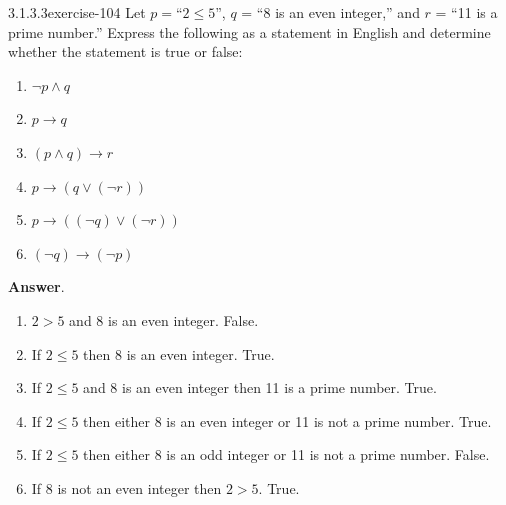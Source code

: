 \documentclass[twoside,10pt,]{book}
\numberwithin{equation}{section}
\begin{document}
\begin{divisionsolution}{3.1.3.3}{}{exercise-104}%
\hypertarget{p-919}{}%
Let \(p =\)``\(2 \leq 5\)'', \(q\) = ``8 is an even integer,'' and \(r\) = ``11 is a prime number.'' Express the following as a statement in English and determine whether the statement is true or false:%
\par
\hypertarget{p-920}{}%
\leavevmode%
\begin{multicols}{2}
\begin{enumerate}[label=(\alph*)]
\item\hypertarget{li-507}{}\hypertarget{p-921}{}%
\(\neg  p \land  q\)%
\item\hypertarget{li-508}{}\hypertarget{p-922}{}%
\(p\rightarrow q\)%
\item\hypertarget{li-509}{}\hypertarget{p-923}{}%
\((p \land q)\to r\)%
\item\hypertarget{li-510}{}\hypertarget{p-924}{}%
\(p \rightarrow (q \lor  (\neg r))\)%
\item\hypertarget{li-511}{}\hypertarget{p-925}{}%
\(p \rightarrow ((\neg q)\lor  (\neg r))\)%
\item\hypertarget{li-512}{}\hypertarget{p-926}{}%
\((\neg q) \rightarrow  (\neg p)\)%
\end{enumerate}
\end{multicols}
%
\par\smallskip%
\noindent\textbf{Answer}.\quad%
\hypertarget{p-927}{}%
\leavevmode%
\begin{enumerate}[label=(\alph*)]
\item\hypertarget{li-513}{}\(2>5\) and 8 is an even integer. False.%
\item\hypertarget{li-514}{}If \(2\leqslant 5\) then 8 is an even integer. True.%
\item\hypertarget{li-515}{}If \(2\leqslant 5\) and 8 is an even integer then 11 is a prime number. True.%
\item\hypertarget{li-516}{}If \(2\leqslant 5\) then either 8 is an even integer or 11 is not a prime number. True.%
\item\hypertarget{li-517}{}If \(2\leqslant 5\) then either 8 is an odd integer or 11 is not a prime number. False.%
\item\hypertarget{li-518}{}If 8 is not an even integer then \(2>5\). True.%
\end{enumerate}
%
\end{divisionsolution}%
\end{document}
